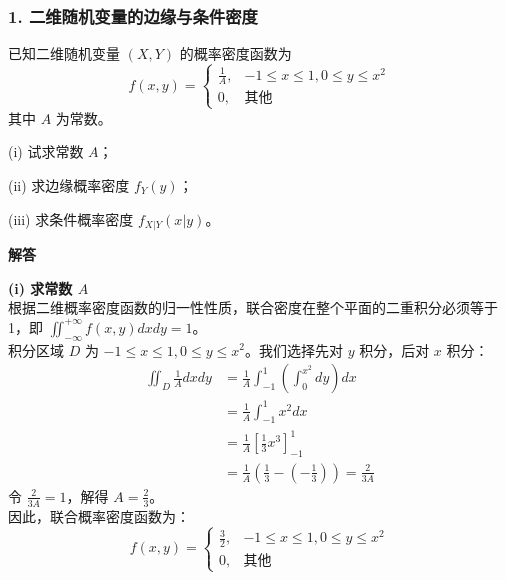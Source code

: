 
\vspace{1.5em}
\subsubsection*{1. 二维随机变量的边缘与条件密度}

\begin{例题}
	已知二维随机变量 $(X,Y)$ 的概率密度函数为
	$$ f(x,y) = \begin{cases} \frac{1}{A}, & -1 \le x \le 1, 0 \le y \le x^2 \\ 0, & \text{其他} \end{cases} $$
	其中 $A$ 为常数。
	
	(i) 试求常数 $A$；
	
	(ii) 求边缘概率密度 $f_Y(y)$；
	
	(iii) 求条件概率密度 $f_{X|Y}(x|y)$。
\end{例题}

\textbf{解答}\quad

\textbf{(i) 求常数 $A$} \\
根据二维概率密度函数的归一性性质，联合密度在整个平面的二重积分必须等于 1，即 $\iint_{-\infty}^{+\infty} f(x,y) dx dy = 1$。\\
积分区域 $D$ 为 $-1 \le x \le 1, 0 \le y \le x^2$。我们选择先对 $y$ 积分，后对 $x$ 积分：
$$ 
\begin{aligned}
\iint_D \frac{1}{A} dx dy &= \frac{1}{A} \int_{-1}^{1} \left( \int_{0}^{x^2} dy \right) dx \\
&= \frac{1}{A} \int_{-1}^{1} x^2 dx \\
&= \frac{1}{A} \left[ \frac{1}{3}x^3 \right]_{-1}^{1} \\
&= \frac{1}{A} \left( \frac{1}{3} - \left(-\frac{1}{3}\right) \right) = \frac{2}{3A}
\end{aligned}
$$
令 $\frac{2}{3A} = 1$，解得 $A = \frac{2}{3}$。\\
因此，联合概率密度函数为：
$$ f(x,y) = \begin{cases} \frac{3}{2}, & -1 \le x \le 1, 0 \le y \le x^2 \\ 0, & \text{其他} \end{cases} $$

